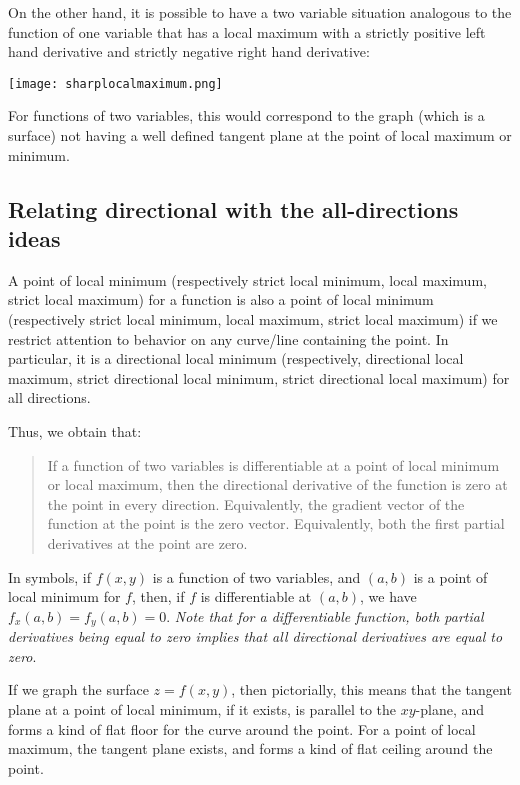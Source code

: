 \documentclass[10pt]{amsart}
\begin{document}
On the other hand, it is possible to have a two variable situation
analogous to the function of one variable that has a local maximum
with a strictly positive left hand derivative and strictly negative
right hand derivative:

\texttt{[image: sharplocalmaximum.png]}

For functions of two variables, this would correspond to the graph
(which is a surface) not having a well defined tangent plane at the
point of local maximum or minimum.
\subsection{Relating directional with the all-directions ideas}

A point of local minimum (respectively strict local minimum, local
maximum, strict local maximum) for a function is also a point of local
minimum (respectively strict local minimum, local maximum, strict
local maximum) if we restrict attention to behavior on any curve/line
containing the point. In particular, it is a directional local minimum
(respectively, directional local maximum, strict directional local
minimum, strict directional local maximum) for all directions.

Thus, we obtain that:

\begin{quote}
  If a function of two variables is differentiable at a point of local
  minimum or local maximum, then the directional derivative of the
  function is zero at the point in every direction. Equivalently, the
  gradient vector of the function at the point is the zero
  vector. Equivalently, both the first partial derivatives at the point
  are zero.
\end{quote}

In symbols, if $f(x,y)$ is a function of two variables, and $(a,b)$ is
a point of local minimum for $f$, then, if $f$ is differentiable at
$(a,b)$, we have $f_x(a,b) = f_y(a,b) = 0$. {\em Note that for a
differentiable function, both partial derivatives being equal to zero
implies that all directional derivatives are equal to zero}.

If we graph the surface $z = f(x,y)$, then pictorially, this means
that the tangent plane at a point of local minimum, if it exists, is
parallel to the $xy$-plane, and forms a kind of flat floor for the
curve around the point. For a point of local maximum, the tangent
plane exists, and forms a kind of flat ceiling around the point.
\end{document}

